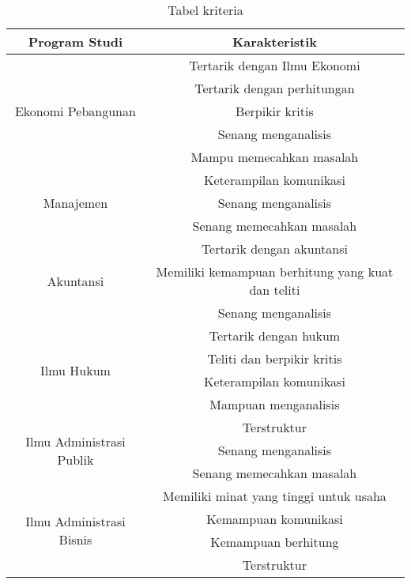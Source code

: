 \begin{table}[H] %
	\centering 
	\caption{Tabel kriteria}
	\label{tab:contoh1}
	\begin{tabular}{| c | c |}
		\hline
		Program Studi & Karakteristik \\

		\hline
		\multirow{5}{10em}{Ekonomi Pebangunan} & Tertarik dengan Ilmu Ekonomi \\
		& Tertarik dengan perhitungan \\
		& Berpikir kritis \\
		& Senang menganalisis\\
		& Mampu memecahkan masalah\\
		
		\hline
		\multirow{3}{10em}{Manajemen} & Keterampilan komunikasi \\
		& Senang menganalisis\\
		& Senang memecahkan masalah\\
		
		\hline
		\multirow{3}{10em}{Akuntansi} & Tertarik dengan akuntansi \\
		& Memiliki kemampuan berhitung yang kuat dan teliti \\
		& Senang menganalisis\\
		
		\hline
		
		\hline
		\multirow{4}{10em}{Ilmu Hukum} & Tertarik dengan hukum \\
		& Teliti dan berpikir kritis \\
		& Keterampilan komunikasi \\
		& Mampuan menganalisis\\
		
		\hline
		\multirow{3}{10em}{Ilmu Administrasi Publik} & Terstruktur \\
		& Senang menganalisis\\
		& Senang memecahkan masalah\\
		
		\hline
		\multirow{4}{10em}{Ilmu Administrasi Bisnis} & Memiliki minat yang tinggi untuk usaha \\
		& Kemampuan komunikasi\\
		& Kemampuan berhitung\\
		& Terstruktur\\
		

\end{tabular}
\end{table}
